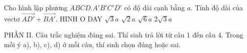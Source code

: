 \begin{ex}
	Cho hình lập phương $ABCD.A'B'C'D'$ có độ dài cạnh bằng $a$. Tính độ dài của vectơ $\vec{AD'}+\vec{BA'}$.
		{\centering\color{red} HINH O DAY}
	\choice
	{$\sqrt{3}a$}
	{$\sqrt{2}a$}
	{\True $\sqrt{6}a$}
	{$2\sqrt{3}a$}
\end{ex}
PHẦN II. Câu trắc nghiệm đúng sai. Thí sinh trả lời từ câu 1 đến câu 4. Trong mỗi ý a), b), c), d) ở mỗi câu, thí sinh chọn đúng hoặc sai.
